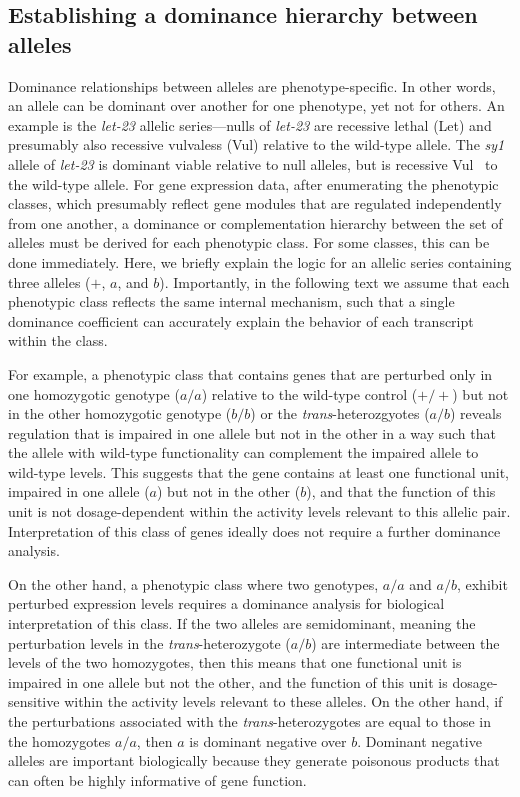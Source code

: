 \documentclass[10pt, twocolumn]{article}
\newcommand{\gene}[1]{\mbox{\emph{#1}}}
\begin{document}
\subsection*{Establishing a dominance hierarchy between alleles}
Dominance relationships between alleles are phenotype-specific. In other words,
an allele can be dominant over another for one phenotype, yet not for others. An
example is the \gene{let-23} allelic series---nulls of \gene{let-23} are
recessive lethal (Let) and presumably also recessive vulvaless (Vul) relative to
the wild-type allele. The \emph{sy1} allele of \gene{let-23} is dominant viable
relative to null alleles, but is recessive Vul~\cite{Aroian1991} to the
wild-type allele. For gene expression data, after enumerating the phenotypic
classes, which presumably reflect gene modules that are regulated independently
from one another, a dominance or complementation hierarchy between the set of
alleles must be derived for each phenotypic class. For some classes, this can be
done immediately. Here, we briefly explain the logic for an allelic series
containing three alleles ($+$, $a$, and $b$). Importantly, in the following
text we assume that each phenotypic class reflects the same internal mechanism,
such that a single dominance coefficient can accurately explain the behavior of
each transcript within the class.

For example, a phenotypic class that contains genes that are perturbed only in
one homozygotic genotype ($a/a$) relative to the wild-type control ($+/+$) but
not in the other homozygotic genotype ($b/b$) or the \emph{trans}-heterozgyotes
($a/b$) reveals regulation that is impaired in one allele but not in the other
in a way such that the allele with wild-type functionality can complement the
impaired allele to wild-type levels. This suggests that the gene contains at
least one functional unit, impaired in one allele ($a$) but not in the other
($b$), and that the function of this unit is not dosage-dependent within the
activity levels relevant to this allelic pair. Interpretation of this class of
genes ideally does not require a further dominance analysis.

On the other hand, a phenotypic class where two genotypes, $a/a$ and $a/b$,
exhibit perturbed expression levels requires a dominance analysis for biological
interpretation of this class. If the two alleles are semidominant, meaning the
perturbation levels in the \emph{trans}-heterozygote ($a/b$) are intermediate
between the levels of the two homozygotes, then this means that one functional
unit is impaired in one allele but not the other, and the function of this unit
is dosage-sensitive within the activity levels relevant to these alleles. On the
other hand, if the perturbations associated with the \emph{trans}-heterozygotes
are equal to those in the homozygotes $a/a$, then $a$ is dominant negative over
$b$. Dominant negative alleles are important biologically because they generate
poisonous products that can often be highly informative of gene function.
\end{document}
